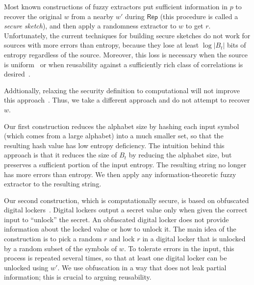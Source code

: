\documentclass[11pt]{article}
\newcommand{\class}[1]{{\ensuremath{\mathsf{#1}}}}
\newcommand{\rep}{\ensuremath{\class{Rep}}\xspace}
\begin{document}

Most known constructions of fuzzy extractors put sufficient information in $p$ to recover the original $w$ from a nearby $w'$ during $\rep$ (this procedure is called a \emph{secure sketch}), and then apply a randomness extractor to $w$ to get $r$.
Unfortunately, the current techniques for building secure sketches do not work for sources with more errors than entropy, because they lose at least $\log |B_t|$ bits of entropy regardless of the source. Moreover, this loss is necessary when the source is uniform~\cite[Lemma C.1]{DBLP:journals/siamcomp/DodisORS08} or when reusability against a sufficiently rich class of correlations is desired~\cite[Theorem 11]{Boyen2004}. 

Addtionally, relaxing the security definition to computational will not improve this approach~\cite[Corollary 3.8, Theorem 3.10]{fuller2013computational}. Thus, we take a different approach and do not attempt to recover $w$.

Our first construction reduces the alphabet size by hashing each input symbol (which comes from a large alphabet) into a much smaller set, so that the resulting hash value has low entropy deficiency.
The intuition behind this approach is that it reduces the size of $B_t$ by reducing the alphabet size, but preserves a sufficient portion of the input entropy.  The resulting string no longer has more errors than entropy.
 We then apply any information-theoretic fuzzy extractor to the resulting string.

Our second construction, which is computationally secure, is based on obfuscated digital lockers~\cite{canetti2008obfuscating}. Digital lockers output a secret value only when given the correct input to ``unlock'' the secret. An obfuscated digital locker does not provide information about the locked value or how to unlock it.  The main idea of the construction is to pick a random $r$ and lock $r$ in a digital locker that is unlocked by a random subset of the symbols of $w$. To tolerate errors in the input, this process is repeated several times, so that at least one digital locker can be unlocked using $w'$. We use obfuscation in a way that does not leak partial information; this is crucial to arguing reusability.
\end{document}
